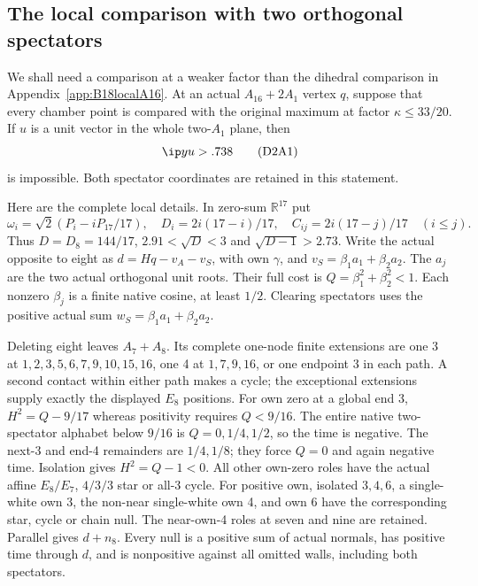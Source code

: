 \subsection{The local comparison with two orthogonal spectators}
\label{app:D18localtwoA1}

We shall need a comparison at a weaker factor than the dihedral
comparison in Appendix~\ref{app:B18localA16}.  At an actual
\(A_{16}+2A_1\) vertex \(q\), suppose that every chamber point is
compared with the original maximum at factor
\(\kappa\le33/20\).  If \(u\) is a unit vector in the whole
two-\(A_1\) plane, then
\[
                     \ip yu>.738
\tag{D2A1}\label{eq:D2A1}
\]
is impossible.  Both spectator coordinates are retained in this
statement.

Here are the complete local details.  In zero-sum \(\mathbb R^{17}\)
put
\[
 \omega_i=\sqrt2(P_i-iP_{17}/17),\quad
 D_i=2i(17-i)/17,\quad C_{ij}=2i(17-j)/17\quad(i\le j).
\]
Thus \(D=D_8=144/17\), \(2.91<\sqrt D<3\) and
\(\sqrt{D-1}>2.73\).
Write the actual opposite to eight as
\(d=Hq-v_A-v_S\), with own \(\gamma\), and
\(v_S=\beta_1a_1+\beta_2a_2\).
The \(a_j\) are the two actual orthogonal unit roots.
Their full cost is \(Q=\beta_1^2+\beta_2^2<1\).
Each nonzero \(\beta_j\) is a finite native cosine, at least \(1/2\).
Clearing spectators uses the positive actual sum
\(w_S=\beta_1a_1+\beta_2a_2\).

Deleting eight leaves \(A_7+A_8\).
Its complete one-node finite extensions are one 3 at
\(1,2,3,5,6,7,9,10,15,16\), one 4 at
\(1,7,9,16\), or one endpoint 3 in each path.
A second contact within either path makes a cycle; the exceptional
extensions supply exactly the displayed \(E_8\) positions.
For own zero at a global end 3,
\(H^2=Q-9/17\) whereas positivity requires \(Q<9/16\).
The entire native two-spectator alphabet below \(9/16\) is
\(Q=0,1/4,1/2\), so the time is negative.
The next-3 and end-4 remainders are \(1/4,1/8\);
they force \(Q=0\) and again negative time.
Isolation gives \(H^2=Q-1<0\).
All other own-zero roles have the actual affine \(E_8/E_7\),
\(4/3/3\) star or all-3 cycle.
For positive own, isolated \(3,4,6\), a single-white own 3,
the non-near single-white own 4, and own 6 have the corresponding
star, cycle or chain null.  The near-own-4 roles at seven and nine
are retained.  Parallel gives \(d+n_8\).
Every null is a positive sum of actual normals, has positive time
through \(d\), and is nonpositive against all omitted walls,
including both spectators.

